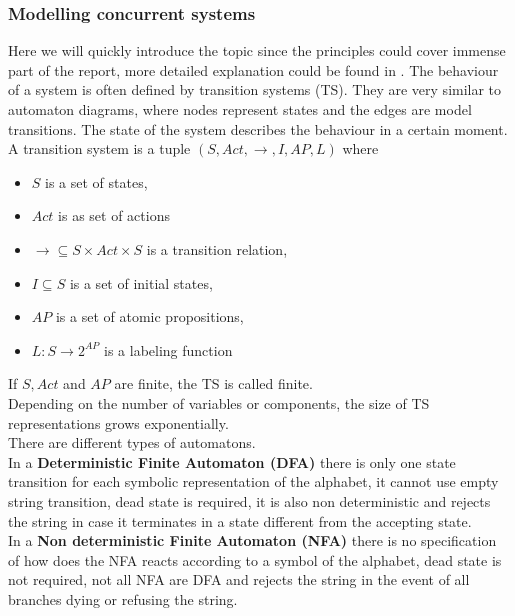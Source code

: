 \documentclass[a4paper, twocolumn]{article}
\begin{document}
\subsubsection{Modelling concurrent systems}
Here we will quickly introduce the topic since the principles could cover immense part of the report, more detailed explanation could be found in \cite{book}.
The behaviour of a system is often defined by transition systems (TS). They are very similar to automaton diagrams, where nodes represent states and the edges are model transitions. The state of the system describes the behaviour in a  certain moment.\\
A transition system is a tuple $(S, Act, \rightarrow , I,AP,L)$ where
\begin{itemize}
    \item $S$ is a set of states,
    \item $Act$ is as set of actions
    \item $\longrightarrow \subseteq S \times Act \times S$ is a transition relation,
    \item $I \subseteq S$ is a set of initial states,
    \item $AP$ is a set of atomic propositions,
    \item $L : S \rightarrow 2^{AP}$ is a labeling function
\end{itemize}
If $S, Act$ and $AP$ are finite, the TS is called finite.\\
Depending on the number of variables or components, the size of TS representations grows exponentially.\\

\noindent There are different types of automatons.\\
In a \textbf{Deterministic Finite Automaton (DFA)} there is only one state transition for each symbolic representation of the alphabet, it cannot use empty string transition, dead state is required, it is also non deterministic and rejects the string in case it terminates in a state different from the accepting state.\\
In a \textbf{Non deterministic Finite Automaton (NFA)} there is no specification of how does the NFA reacts according to a symbol of the alphabet, dead state is not required, not all NFA are DFA and rejects the string in the event of all branches dying or refusing the string.
\end{document}
